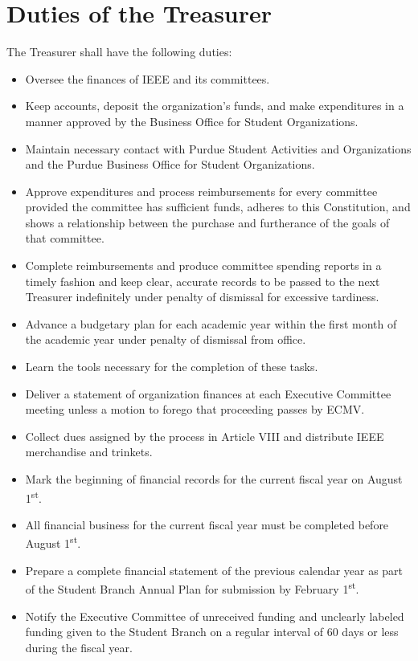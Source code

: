 \documentclass[12pt]{constitution}
\newcommand{\dateannualplansubmit}{February 1\textsuperscript{st}} %
\newcommand{\datefiscalstart}{August 1\textsuperscript{st}} %
\begin{document}
\section{Duties of the Treasurer}
\label{sec:officer_treas}
The Treasurer shall have the following duties:
\begin{itemize}
    \item Oversee the finances of IEEE and its committees.
    \item Keep accounts, deposit the organization's funds, and make expenditures in a manner approved by the Business Office for Student Organizations.
    \item Maintain necessary contact with Purdue Student Activities and Organizations and the Purdue Business Office for Student Organizations.
    \item Approve expenditures and process reimbursements for every committee provided the committee has sufficient funds, adheres to this Constitution, and shows a relationship between the purchase and furtherance of the goals of that committee.
    \item Complete reimbursements and produce committee spending reports in a timely fashion and keep clear, accurate records to be passed to the next Treasurer indefinitely under penalty of dismissal for excessive tardiness.
    \item Advance a budgetary plan for each academic year within the first month of the academic year under penalty of dismissal from office.
    \item Learn the tools necessary for the completion of these tasks.
    \item Deliver a statement of organization finances at each Executive Committee meeting unless a motion to forego that proceeding passes by ECMV.
    \item Collect dues assigned by the process in Article VIII and distribute IEEE merchandise and trinkets.
    \item Mark the beginning of financial records for the current fiscal year on \datefiscalstart{}.
    \item All financial business for the current fiscal year must be completed before \datefiscalstart{}.
    \item Prepare a complete financial statement of the previous calendar year as part of the Student Branch Annual Plan for submission by \dateannualplansubmit{}.
    \item Notify the Executive Committee of unreceived funding and unclearly labeled funding given to the Student Branch on a regular interval of 60 days or less during the fiscal year.
\end{itemize}
\end{document}
